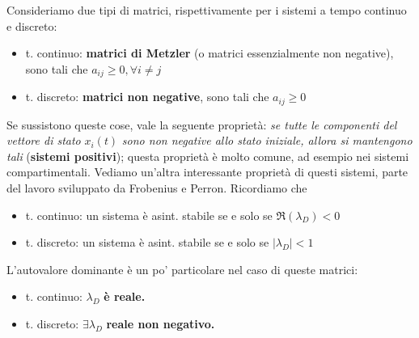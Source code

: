 Consideriamo due tipi di matrici, rispettivamente per i sistemi a tempo continuo e discreto:
\begin{itemize}
	\item t. continuo: \textbf{matrici di Metzler} (o matrici essenzialmente non negative), sono tali che $a_{ij} \geq 0,\forall i\neq j$
	\item t. discreto: \textbf{matrici non negative}, sono tali che $a_{ij} \geq 0$
\end{itemize}

Se sussistono queste cose, vale la seguente proprietà: \textit{se tutte le componenti del vettore di stato }$x_i(t)$\textit{ sono non negative allo stato iniziale, allora si mantengono tali} (\textbf{sistemi positivi}); questa proprietà è molto comune, ad esempio nei sistemi compartimentali. Vediamo un'altra interessante proprietà di questi sistemi, parte del lavoro sviluppato da Frobenius e Perron. Ricordiamo che
\begin{itemize}
	\item t. continuo: un sistema è asint. stabile se e solo se $\Re(\lambda _D) < 0$
	\item t. discreto: un sistema è asint. stabile se e solo se $| \lambda _D| < 1$
\end{itemize}

L'autovalore dominante è un po' particolare nel caso di queste matrici:
\begin{itemize}
	\item t. continuo: $\lambda _D$ \textbf{è reale.}
	\item t. discreto: $\exists \lambda _D$ \textbf{reale non negativo.}
\end{itemize}


